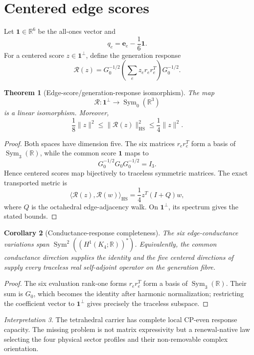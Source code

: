\documentclass[11pt,oneside,openany]{book}
\numberwithin{equation}{chapter}
\newtheorem{theorem}{Theorem}[chapter]
\newtheorem{corollary}[theorem]{Corollary}
\theoremstyle{definition}
\theoremstyle{remark}
\newtheorem{interpretation}[theorem]{Interpretation}
\newcommand{\R}{\mathbb R}
\newcommand{\HS}{\mathrm{HS}}
\newcommand{\norm}[1]{\lVert #1\rVert}
\newcommand{\ip}[2]{\langle #1,#2\rangle}
\begin{document}
\section{Centered edge scores}
Let $\mathbf1\in\R^6$ be the all-ones vector and
\[
 q_e=\mathbf e_e-\frac16\mathbf1.
\]
For a centered score $z\in\mathbf1^\perp$, define the generation response
\[
 \mathscr R(z)
 =G_0^{-1/2}\left(\sum_ez_er_er_e^T\right)G_0^{-1/2}.
\]

\begin{theorem}[Edge-score/generation-response isomorphism]
\label{thm:response-isomorphism}
The map
\[
 \mathscr R:\mathbf1^\perp\longrightarrow\operatorname{Sym}_0(\R^3)
\]
is a linear isomorphism.  Moreover,
\[
 \frac18\norm{z}^2
 \le
 \norm{\mathscr R(z)}_{\HS}^2
 \le
 \frac14\norm{z}^2.
\]
\end{theorem}

\begin{proof}
Both spaces have dimension five.  The six matrices $r_er_e^T$ form a basis of $\operatorname{Sym}_3(\R)$, while the common score $\mathbf1$ maps to
\[
 G_0^{-1/2}G_0G_0^{-1/2}=I_3.
\]
Hence centered scores map bijectively to traceless symmetric matrices.  The exact transported metric is
\[
 \ip{\mathscr R(z)}{\mathscr R(w)}_{\HS}
 =\frac14z^T(I+Q)w,
\]
where $Q$ is the octahedral edge-adjacency walk.  On $\mathbf1^\perp$, its spectrum gives the stated bounds.
\end{proof}


\begin{corollary}[Conductance-response completeness]
\label{cor:conductance-completeness}
The six edge-conductance variations span
\(\operatorname{Sym}^2((H^1(K_4;\R))^*)\).  Equivalently, the common
conductance direction supplies the identity and the five centered directions
of  supply every traceless real self-adjoint
operator on the generation fibre.
\end{corollary}

\begin{proof}
The six evaluation rank-one forms \(r_er_e^T\) form a basis of
\(\operatorname{Sym}_3(\R)\).  Their sum is \(G_0\), which becomes the
identity after harmonic normalization; restricting the coefficient vector to
\(\mathbf1^\perp\) gives precisely the traceless subspace.
\end{proof}

\begin{interpretation}
The tetrahedral carrier has complete local CP-even response capacity.
The missing problem is not matrix expressivity but a renewal-native law
selecting the four physical sector profiles and their non-removable complex
orientation.
\end{interpretation}
\end{document}
